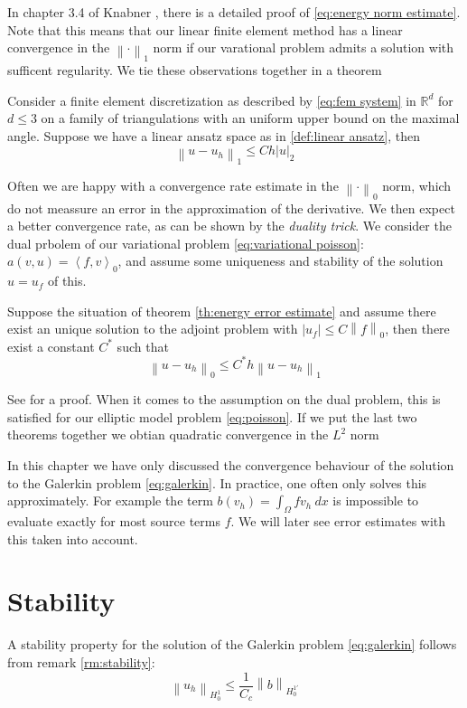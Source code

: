 \documentclass[../Main/main.tex]{subfiles}
\begin{document}
	In chapter 3.4 of Knabner \cite{Knabner}, there is a detailed proof of \eqref{eq:energy norm estimate}.\\
	Note that this means that our linear finite element method has a linear convergence in the $\left \| \cdot \right \|_1$ norm if our varational problem admits a solution with sufficent regularity. We tie these observations together in a theorem
	\begin{theorem}\label{th:energy error estimate}
		Consider a finite element discretization as described by \eqref{eq:fem system} in $\mathbb{R}^d$ for $d\leq 3$ on a family of triangulations with an uniform upper bound on the maximal angle. Suppose we have a linear ansatz space as in \ref{def:linear ansatz}, then
		\begin{equation}
			\left \| u-u_h \right \|_{1}\leq C h|u|_{2}
		\end{equation}
	\end{theorem}
	Often we are happy with a convergence rate estimate in the $\left \| \cdot \right \|_0$ norm, which do not meassure an error in the approximation of the derivative. We then expect a better convergence rate, as can be shown by the \emph{duality trick}. We consider the dual prbolem of our variational problem \eqref{eq:variational poisson}: $a(v,u) = \left \langle f,v\right \rangle_0$, and assume some uniqueness and stability of the solution $u = u_f$ of this. 
	\begin{theorem}[$L^2$ estimate]
		Suppose the situation of theorem \ref{th:energy error estimate} and assume there exist an unique solution to the adjoint problem with $| u_f| \leq C \left \|f \right \|_0$, then there exist a constant $C^*$ such that 
		\begin{equation}
			\left \| u - u_h \right \|_0 \leq C^* h \left \| u- u_h \right \|_1
		\end{equation}
	\end{theorem}
	See \cite{Knabner} for a proof. When it comes to the assumption on the dual problem, this is satisfied for our elliptic model problem \ref{eq:poisson}. If we put the last two theorems together we obtian quadratic convergence in the $L^2$ norm
	\begin{remark}
		In this chapter we have only discussed the convergence behaviour of the solution to the Galerkin problem \eqref{eq:galerkin}. In practice, one often only solves this approximately. For example the term  $b(v_h)=\int_{\Omega}fv_h \ dx$ is impossible to evaluate exactly for most source terms $f$. We will later see error estimates with this taken into account.
	\end{remark}
	\section*{Stability}
	A stability property for the solution of the Galerkin problem \eqref{eq:galerkin} follows from remark \eqref{rm:stability}:
	\begin{equation*}
		\left \| u_h \right \|_{H_0^1} \leq \frac{1}{C_c}\left \| b \right \|_{H_0^{1'}}
	\end{equation*}

	
	
\end{document}
